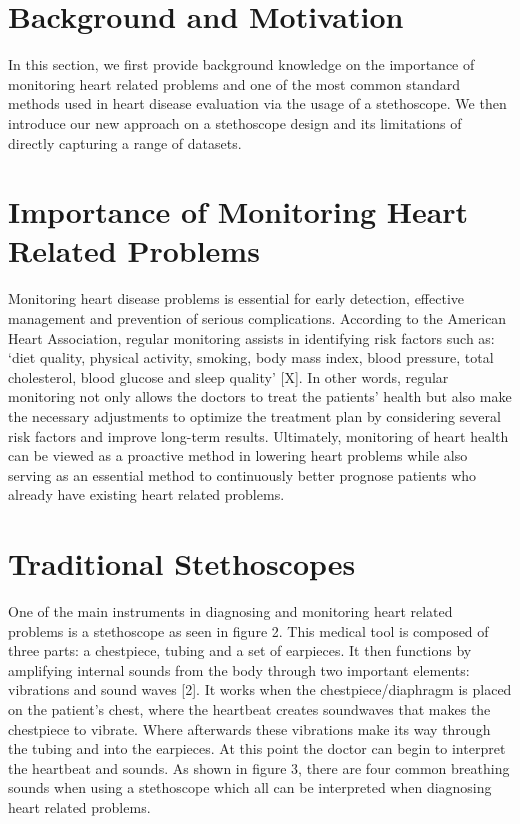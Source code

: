 \documentclass[twocolumn]{article}
\begin{document}
\section{Background and Motivation} 
In this section, we first provide background knowledge on the importance of monitoring heart related problems 
and one of the most common standard methods used in heart disease evaluation via the usage 
of a stethoscope. We then introduce our new approach on a stethoscope design and its limitations 
of directly capturing a range of datasets.

\section{Importance of Monitoring Heart Related Problems} 
Monitoring heart disease problems is essential for early detection, effective management and prevention of serious complications. 
According to the American Heart Association, regular monitoring assists in identifying risk factors such as: 
‘diet quality, physical activity, smoking, body mass index, blood pressure, total cholesterol, blood glucose and sleep quality’ [X]. 
In other words, regular monitoring not only allows the doctors to treat the patients’ health 
but also make the necessary adjustments to optimize the treatment plan by considering several risk factors 
and improve long-term results. Ultimately, monitoring of heart health can be viewed as a proactive method 
in lowering heart problems while also serving as an essential method to continuously better prognose patients 
who already have existing heart related problems. 

\section{Traditional Stethoscopes} 
One of the main instruments in diagnosing and monitoring heart related problems is a stethoscope as 
seen in figure 2. This medical tool is composed of three parts: a chestpiece, tubing and 
a set of earpieces. It then functions by amplifying internal sounds from the body through two 
important elements: vibrations and sound waves [2]. It works when the chestpiece/diaphragm is placed on the 
patient’s chest, where the heartbeat creates soundwaves that makes the chestpiece to vibrate. Where afterwards these 
vibrations make its way through the tubing and into the earpieces. At this point the doctor 
can begin to interpret the heartbeat and sounds. As shown in figure 3, there are four 
common breathing sounds when using a stethoscope which all can be interpreted when diagnosing heart related problems. 
\end{document}
